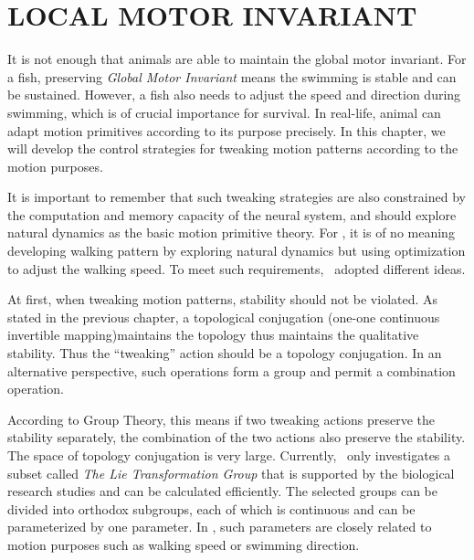 \chapter{LOCAL MOTOR INVARIANT}
\label{chap:li}

\graphicspath{{LocalInvariant/LocalInvariantFigs/EPS/}{LocalInvariant/LocalInvariantFigs/}}
It is not enough that animals are able to maintain the global motor invariant.
For a fish, preserving \emph{Global Motor Invariant}  means the swimming is stable and can be sustained.
However,  a fish also needs to adjust the speed and direction during swimming, which is of crucial importance for survival.
In real-life, animal can adapt motion primitives according to its purpose precisely.
In this chapter, we will develop the control strategies for tweaking motion patterns according to the motion purposes.

It is important to remember that such tweaking strategies are also constrained by the computation and memory capacity of the neural system, and should explore natural dynamics as the basic motion primitive theory. 
For \cms, it is of no meaning developing walking pattern by exploring natural dynamics but using optimization to adjust the walking speed. 
To meet such requirements, \moit\ adopted different ideas.

At first, when tweaking motion patterns, stability should not be violated. 
As stated in the previous chapter, a topological conjugation (one-one continuous invertible mapping)maintains the topology thus maintains the qualitative stability. Thus the ``tweaking'' action should be a topology conjugation. In an alternative perspective, such operations form a group and permit a combination operation. 

According to Group Theory, this means if two tweaking actions preserve the stability separately, the combination of the two actions also preserve the stability.
The space of topology conjugation is very large.
Currently, \moit\ only investigates a subset called \emph{The Lie Transformation Group} that is supported by the biological research studies and can be calculated efficiently.
The selected groups can be divided into orthodox subgroups, each of which is continuous and can be parameterized by one parameter.
In \cms, such parameters are closely related to motion purposes such as walking speed or swimming direction.

